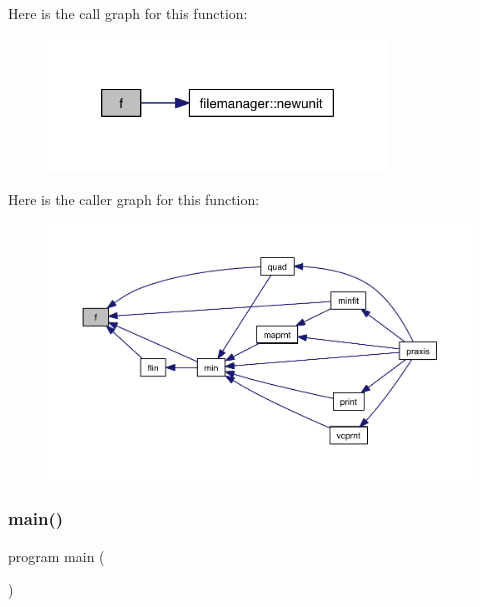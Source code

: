 Here is the call graph for this function\+:\nopagebreak
\begin{figure}[H]
\begin{center}
\leavevmode
\includegraphics[width=254pt]{src_2system__driver_8f90_aa2135d8f316dac80d3d2ba872771b95b_cgraph}
\end{center}
\end{figure}
Here is the caller graph for this function\+:\nopagebreak
\begin{figure}[H]
\begin{center}
\leavevmode
\includegraphics[width=350pt]{src_2system__driver_8f90_aa2135d8f316dac80d3d2ba872771b95b_icgraph}
\end{center}
\end{figure}
\mbox{\label{src_2system__driver_8f90_a8ec2266d83cd6c0b762cbcbc92c0af3d}} 
\subsubsection{\texorpdfstring{main()}{main()}}
{\footnotesize\ttfamily program main (\begin{DoxyParamCaption}{ }\end{DoxyParamCaption})}



